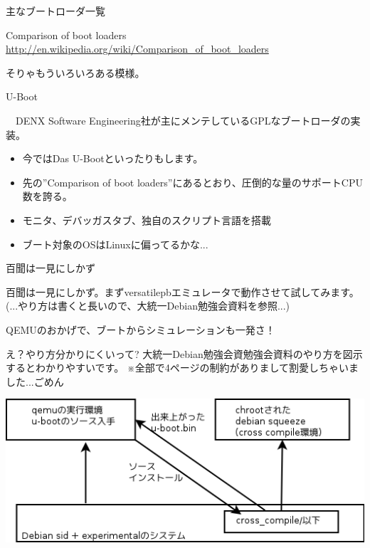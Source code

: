 \begin{frame}{主なブートローダ一覧}

Comparison of boot loaders\\
\url{http://en.wikipedia.org/wiki/Comparison_of_boot_loaders}

そりゃもういろいろある模様。

\end{frame}

\begin{frame}{U-Boot}

　DENX Software Engineering社が主にメンテしているGPLなブートローダの実装。
 \begin{itemize}
  \item 今ではDas U-Bootといったりもします。
  \item 先の''Comparison of boot loaders''にあるとおり、圧倒的な量のサポートCPU数を誇る。
  \item モニタ、デバッガスタブ、独自のスクリプト言語を搭載
  \item ブート対象のOSはLinuxに偏ってるかな...
 \end{itemize}

\end{frame}

\begin{frame}{百聞は一見にしかず}

百聞は一見にしかず。まずversatilepbエミュレータで動作させて試してみます。
(...やり方は書くと長いので、大統一Debian勉強会資料を参照...)

QEMUのおかげで、ブートからシミュレーションも一発さ！
\end{frame}

\begin{frame}{え？やり方分かりにくいって?}
大統一Debian勉強会資勉強会資料のやり方を図示するとわかりやすいです。
※全部で4ページの制約がありまして割愛しちゃいました...ごめん

\begin{center}
  \includegraphics[width=1.0\hsize]{image2012-gum/u-boot-cross-diagram.png}
\end{center}


\end{frame}

